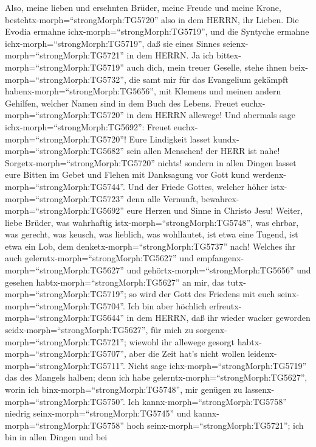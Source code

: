  Also, meine lieben und ersehnten Brüder, meine Freude und
meine Krone, bestehtx-morph=``strongMorph:TG5720'' also in dem HERRN,
ihr Lieben.  Die Evodia ermahne
ichx-morph=``strongMorph:TG5719'', und die Syntyche ermahne
ichx-morph=``strongMorph:TG5719'', daß sie eines Sinnes
seienx-morph=``strongMorph:TG5721'' in dem HERRN.  Ja ich
bittex-morph=``strongMorph:TG5719'' auch dich, mein treuer Geselle,
stehe ihnen beix-morph=``strongMorph:TG5732'', die samt mir für das
Evangelium gekämpft habenx-morph=``strongMorph:TG5656'', mit Klemens und
meinen andern Gehilfen, welcher Namen sind in dem Buch des Lebens.
 Freuet euchx-morph=``strongMorph:TG5720'' in dem HERRN
allewege! Und abermals sage ichx-morph=``strongMorph:TG5692'': Freuet
euchx-morph=``strongMorph:TG5720''!  Eure Lindigkeit lasset
kundx-morph=``strongMorph:TG5682'' sein allen Menschen! der HERR ist
nahe!  Sorgetx-morph=``strongMorph:TG5720'' nichts! sondern
in allen Dingen lasset eure Bitten im Gebet und Flehen mit Danksagung
vor Gott kund werdenx-morph=``strongMorph:TG5744''.  Und der
Friede Gottes, welcher höher istx-morph=``strongMorph:TG5723'' denn alle
Vernunft, bewahrex-morph=``strongMorph:TG5692'' eure Herzen und Sinne in
Christo Jesu!  Weiter, liebe Brüder, was wahrhaftig
istx-morph=``strongMorph:TG5748'', was ehrbar, was gerecht, was keusch,
was lieblich, was wohllautet, ist etwa eine Tugend, ist etwa ein Lob,
dem denketx-morph=``strongMorph:TG5737'' nach!  Welches ihr
auch gelerntx-morph=``strongMorph:TG5627'' und
empfangenx-morph=``strongMorph:TG5627'' und
gehörtx-morph=``strongMorph:TG5656'' und gesehen
habtx-morph=``strongMorph:TG5627'' an mir, das
tutx-morph=``strongMorph:TG5719''; so wird der Gott des Friedens mit
euch seinx-morph=``strongMorph:TG5704''.  Ich bin aber
höchlich erfreutx-morph=``strongMorph:TG5644'' in dem HERRN, daß ihr
wieder wacker geworden seidx-morph=``strongMorph:TG5627'', für mich zu
sorgenx-morph=``strongMorph:TG5721''; wiewohl ihr allewege gesorgt
habtx-morph=``strongMorph:TG5707'', aber die Zeit hat's nicht wollen
leidenx-morph=``strongMorph:TG5711''.  Nicht sage
ichx-morph=``strongMorph:TG5719'' das des Mangels halben; denn ich habe
gelerntx-morph=``strongMorph:TG5627'', worin ich
binx-morph=``strongMorph:TG5748'', mir genügen zu
lassenx-morph=``strongMorph:TG5750''.  Ich
kannx-morph=``strongMorph:TG5758'' niedrig
seinx-morph=``strongMorph:TG5745'' und
kannx-morph=``strongMorph:TG5758'' hoch
seinx-morph=``strongMorph:TG5721''; ich bin in allen Dingen und bei
